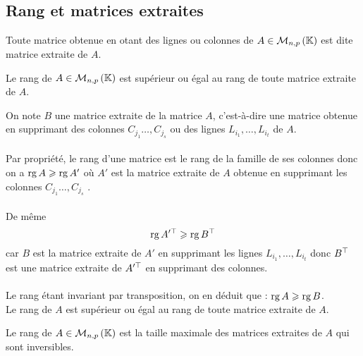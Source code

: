 \subsection{Rang et matrices extraites}
\begin{defi}
    Toute matrice obtenue en otant des lignes ou colonnes de \(A \in \M{n,p}\) est dite matrice extraite de \(A\).
\end{defi}
\begin{prop}
    Le rang de \(A \in \M{n,p}\) est supérieur ou égal au rang de toute matrice extraite de \(A\).
\end{prop}
\begin{dem}
    On note \(B\) une matrice extraite de la matrice \(A\), c’est-à-dire une matrice obtenue en supprimant des colonnes \(C_{j_1} \dots , C_{j_s}\) ou des lignes \(L_{i_1} , \dots , L_{i_t}\) de \(A\).\\~\\
    Par propriété, le rang d’une matrice est le rang de la famille de ses colonnes donc on a \(\operatorname{rg} A \geqslant \operatorname{rg} A'\)
    où \(A'\) est la matrice extraite de \(A\) obtenue en supprimant les colonnes \(C_{j_1} \dots , C_{j_s}\) .\\~\\
    De même
    \[\operatorname{rg}A'^{\top} \geqslant \operatorname{rg} B^{\top}\]
    car \(B\) est la matrice extraite de \(A'\) en supprimant les lignes \(L_{i_1} , \dots , L_{i_t}\) donc \(B^{\top}\) est une matrice extraite de \(A'^{\top}\) en supprimant des colonnes.\\~\\
    Le rang étant invariant par transposition, on en déduit que : \(\operatorname{rg} A \geqslant \operatorname{rg} B\).\\
    \conclusion Le rang de \(A\) est supérieur ou égal au rang de toute matrice extraite de \(A\).
\end{dem}
\begin{defprop}
Le rang de \(A \in \M{n,p}\) est la taille maximale des matrices extraites de \(A\) qui sont inversibles.
\end{defprop}
